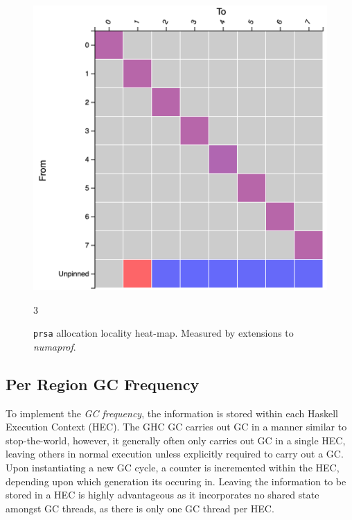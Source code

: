 \documentclass{paper}\usepackage{graphicx}
\begin{document}
\begin{figure}[!htb]
\begin{multicols}{3}
    \caption{\lstinline{prsa} allocation locality heat-map. Measured by extensions to \textit{numaprof}.}
    \label{fig:prsa_alloc}
    \includegraphics[width=\linewidth]{Paper/images/prsa/prsa_alloc.png}\par
    \end{multicols}{3}
    \label{fig:dnc_static}
\end{figure}

\subsection{Per Region GC Frequency}
\label{sec:frequency}

To implement the \textit{GC frequency}, the information is stored within each Haskell Execution Context (HEC). The GHC GC carries out GC in a manner similar to stop-the-world, however, it generally often only carries out GC in a single HEC, leaving others in normal execution unless explicitly required to carry out a GC. Upon instantiating a new GC cycle, a counter is incremented within the HEC, depending upon which generation its occuring in. Leaving the information to be stored in a HEC is highly advantageous as it incorporates no shared state amongst GC threads, as there is only one GC thread per HEC.
\end{document}
